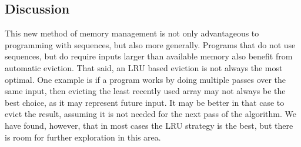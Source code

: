 \subsection{Discussion}

This new method of memory management is not only advantageous to programming with sequences, but also more generally. Programs that do not use sequences, but do require inputs larger than available memory also benefit from automatic eviction. That said, an LRU based eviction is not always the most optimal. One example is if a program works by doing multiple passes over the same input, then evicting the least recently used array may not always be the best choice, as it may represent future input. It may be better in that case to evict the result, assuming it is not needed for the next pass of the algorithm. We have found, however, that in most cases the LRU strategy is the best, but there is room for further exploration in this area.